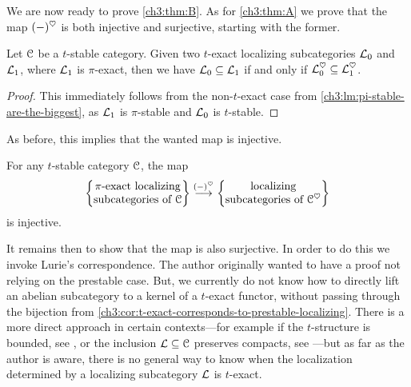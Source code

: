 





We are now ready to prove \cref{ch3:thm:B}. As for \cref{ch3:thm:A} we prove that the map $(-)^\heartsuit$ is both injective and surjective, starting with the former. 

\begin{lemma}
    \label{ch3:lm:pi-exact-are-the-biggest}
    Let $\EuScript{C}$ be a $t$-stable category. Given two $t$-exact localizing subcategories $\mathcal{L}_0$ and $\mathcal{L}_1$, where $\mathcal{L}_1$ is $\pi$-exact, then we have $\mathcal{L}_0 \subseteq \mathcal{L}_1$ if and only if $\mathcal{L}_0^\heartsuit \subseteq \mathcal{L}_1^\heartsuit$. 
\end{lemma}
\begin{proof}
    This immediately follows from the non-$t$-exact case from \cref{ch3:lm:pi-stable-are-the-biggest}, as $\mathcal{L}_1$ is $\pi$-stable and $\mathcal{L}_0$ is $t$-stable. 
\end{proof}

As before, this implies that the wanted map is injective. 

\begin{corollary}
    \label{ch3:cor:pi-exact-heart-injective}
    For any $t$-stable category $\EuScript{C}$, the map
    \[\left\{ \begin{matrix} \pi\text{-exact localizing}\\ \text{subcategories of }\EuScript{C} \end{matrix} \right\} \overset{(-)^\heartsuit}{\longrightarrow} \left\{ \begin{matrix} \text{localizing}\\ \text{subcategories of }\EuScript{C}^\heartsuit \end{matrix} \right\}\]
    is injective. 
\end{corollary}

It remains then to show that the map is also surjective. In order to do this we invoke Lurie's correspondence. The author originally wanted to have a proof not relying on the prestable case. But, we currently do not know how to directly lift an abelian subcategory to a kernel of a $t$-exact functor, without passing through the bijection from \cref{ch3:cor:t-exact-corresponds-to-prestable-localizing}. There is a more direct approach in certain contexts---for example if the $t$-structure is bounded, see \cite[2.20]{antieau-gepner-heller_2019}, or the inclusion $\mathcal{L}\subseteq \EuScript{C}$ preserves compacts, see \cite[2.7]{hennion-porta-vezzosi_2016}---but as far as the author is aware, there is no general way to know when the localization determined by a localizing subcategory $\mathcal{L}$ is $t$-exact. 

